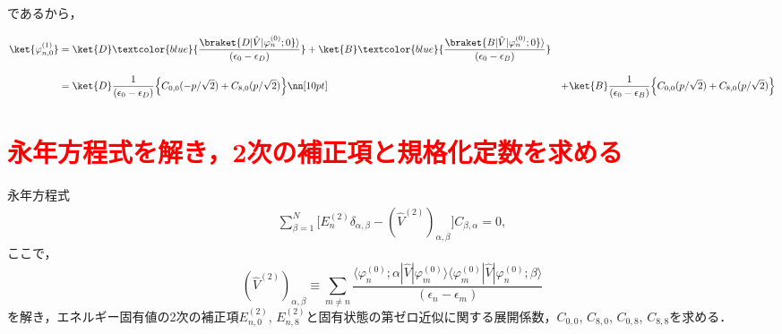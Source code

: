 であるから，

\begin{align}
    \ket{\varphi_{n,0}^{(1)}}
    &=
    \ket{D}
    \textcolor{blue}{
    \frac{\braket{D|\hat{V}|\varphi^{(0)}_n;0}\rangle}{(\epsilon_{0}-\epsilon_D)}}
    +
    \ket{B}
    \textcolor{blue}{
    \frac{\braket{B|\hat{V}|\varphi^{(0)}_n;0}\rangle}{(\epsilon_0-\epsilon_B)}}\\[10pt]
    &=\ket{D}
    \frac{1}{(\epsilon_{0}-\epsilon_D)}
    \Bigl\{C_{0,0}(-p/\sqrt{2}) + C_{8,0} (p/\sqrt{2})\Bigr\}\nn[10pt]
    &+
    \ket{B}
    \frac{1}{(\epsilon_{0}-\epsilon_B)}
    \Bigl\{C_{0,0}(p/\sqrt{2}) + C_{8,0} (p/\sqrt{2})\Bigr\}
\end{align}






\section*{\textcolor{red}{永年方程式を解き，2次の補正項と規格化定数を求める}}
永年方程式
\begin{align}\label{2ndpertubation_matrix}
\sum_{\beta=1}^{N}\Biggl[
E^{(2)}_n \delta_{\alpha,\beta}
-(\hat{V}^{(2)})_{\alpha,\beta}
\biggr]C_{\beta,\alpha}=0,
\end{align}
ここで，
\begin{equation}
    (\hat{V}^{(2)})_{\alpha,\beta}
    \equiv\sum_{m\neq n}
    \frac{\langle{\varphi^{(0)}_n;\alpha|\hat{V}|\varphi^{(0)}_m}\rangle
    \langle{\varphi^{(0)}_{m}|\hat{V}|\varphi^{(0)}_n;\beta}\rangle}
    {(\epsilon_n-\epsilon_m)}
\end{equation}
を解き，エネルギー固有値の2次の補正項$E_{n,0}^{(2)}$, $E_{n,8}^{(2)}$と固有状態の第ゼロ近似に関する展開係数，$C_{0,0}$, $C_{8,0}$, $C_{0,8}$, $C_{8,8}$を求める．





